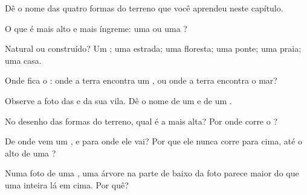 \begin{exercise}[$\star$]\label{exo:g1:landscapes-around-us:1}
Dê o nome das quatro formas do terreno que você aprendeu neste capítulo.
\end{exercise}

\begin{exercise}[$\star$]\label{exo:g1:landscapes-around-us:2}
O que é mais alto e mais íngreme: uma  ou uma ?
\end{exercise}

\begin{exercise}[$\star$]\label{exo:g1:landscapes-around-us:3}
Natural ou construído? Um ; uma estrada; uma floresta; uma ponte; uma praia; uma casa.
\end{exercise}

\begin{exercise}[$\star$]\label{exo:g1:landscapes-around-us:4}
Onde fica o : onde a terra encontra um , ou onde a terra
encontra o mar?
\end{exercise}

\begin{exercise}[$\star$]\label{exo:g1:landscapes-around-us:5}
Observe a foto das  e da sua vila. Dê o nome de um  e de um .
\end{exercise}

\begin{exercise}[$\star$]\label{exo:g1:landscapes-around-us:6}
No desenho das formas do terreno, qual  é a mais alta? Por
onde corre o ?
\end{exercise}

\begin{exercise}[$\star\star$]\label{exo:g1:landscapes-around-us:7}
De onde vem um , e para onde ele vai? Por que ele nunca corre para
cima, até o alto de uma ?
\end{exercise}

\begin{exercise}[$\star\star$]\label{exo:g1:landscapes-around-us:8}
Numa foto de uma , uma árvore na parte de baixo da foto parece
maior do que uma  inteira lá em cima. Por quê?
\end{exercise}

